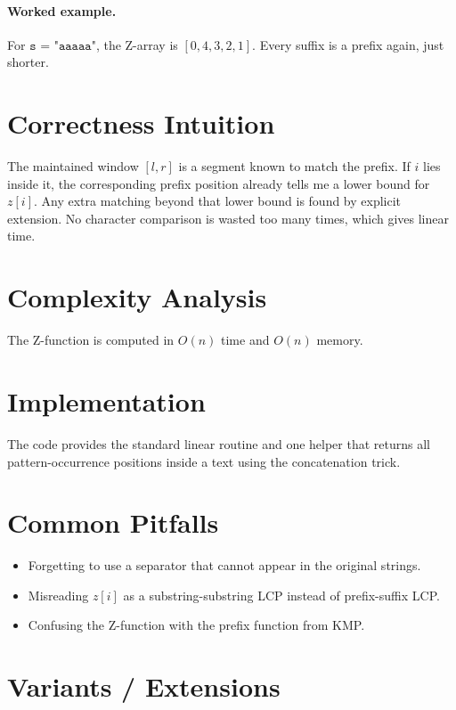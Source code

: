 \paragraph{Worked example.}
For \(\texttt{s = "aaaaa"}\), the Z-array is \([0, 4, 3, 2, 1]\). Every suffix is a prefix again, just shorter.

\section*{Correctness Intuition}

The maintained window \([l, r]\) is a segment known to match the prefix. If \(i\) lies inside it, the corresponding
prefix position already tells me a lower bound for \(z[i]\). Any extra matching beyond that lower bound is found by
explicit extension. No character comparison is wasted too many times, which gives linear time.

\section*{Complexity Analysis}

The Z-function is computed in \(O(n)\) time and \(O(n)\) memory.

\section*{Implementation}

The code provides the standard linear routine and one helper that returns all pattern-occurrence positions inside a text
using the concatenation trick.

\section*{Common Pitfalls}

\begin{itemize}
  \item Forgetting to use a separator that cannot appear in the original strings.
  \item Misreading \(z[i]\) as a substring-substring LCP instead of prefix-suffix LCP.
  \item Confusing the Z-function with the prefix function from KMP.
\end{itemize}

\section*{Variants / Extensions}

